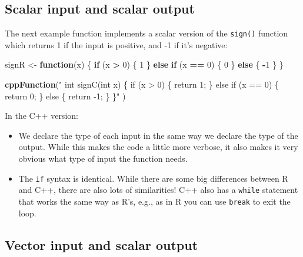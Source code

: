 \documentclass[]{krantz}
\makeatletter
\newenvironment{Shaded}{\begin{snugshade}}{\end{snugshade}}
\newcommand{\KeywordTok}[1]{\textcolor[rgb]{0.27,0.27,0.27}{\textbf{#1}}}
\newcommand{\DecValTok}[1]{\textcolor[rgb]{0.06,0.06,0.06}{#1}}
\newcommand{\StringTok}[1]{\textcolor[rgb]{0.5,0.5,0.5}{#1}}
\newcommand{\ControlFlowTok}[1]{\textcolor[rgb]{0.27,0.27,0.27}{\textbf{#1}}}
\newcommand{\OperatorTok}[1]{\textcolor[rgb]{0.43,0.43,0.43}{\textbf{#1}}}
\newcommand{\NormalTok}[1]{#1}
\newenvironment{kframe}{%
\medskip{}
\setlength{\fboxsep}{.8em}
 \def\at@end@of@kframe{}%
 \ifinner\ifhmode%
  \def\at@end@of@kframe{\end{minipage}}%
  \begin{minipage}{\columnwidth}%
 \fi\fi%
 \def\FrameCommand##1{\hskip\@totalleftmargin \hskip-\fboxsep
 \colorbox{shadecolor}{##1}\hskip-\fboxsep
     \hskip-\linewidth \hskip-\@totalleftmargin \hskip\columnwidth}%
 \MakeFramed {\advance\hsize-\width
   \@totalleftmargin\z@ \linewidth\hsize
   \@setminipage}}%
 {\par\unskip\endMakeFramed%
 \at@end@of@kframe}
\renewenvironment{Shaded}{\begin{kframe}}{\end{kframe}}
\makeatother
\begin{document}
\subsection{Scalar input and scalar
output}\label{scalar-input-and-scalar-output}

The next example function implements a scalar version of the
\texttt{sign()} function which returns 1 if the input is positive, and
-1 if it's negative:

\begin{Shaded}
\begin{Highlighting}[]
\NormalTok{signR <-}\StringTok{ }\ControlFlowTok{function}\NormalTok{(x) \{}
    \ControlFlowTok{if}\NormalTok{ (x }\OperatorTok{>}\StringTok{ }\DecValTok{0}\NormalTok{) \{}
        \DecValTok{1}
\NormalTok{    \} }\ControlFlowTok{else} \ControlFlowTok{if}\NormalTok{ (x }\OperatorTok{==}\StringTok{ }\DecValTok{0}\NormalTok{) \{}
        \DecValTok{0}
\NormalTok{    \} }\ControlFlowTok{else}\NormalTok{ \{}
        \OperatorTok{-}\DecValTok{1}
\NormalTok{    \}}
\NormalTok{\}}

\KeywordTok{cppFunction}\NormalTok{(}\StringTok{"}
\StringTok{  int signC(int x) \{}
\StringTok{    if (x > 0) \{}
\StringTok{      return 1;}
\StringTok{    \} else if (x == 0) \{}
\StringTok{      return 0;}
\StringTok{    \} else \{}
\StringTok{      return -1;}
\StringTok{    \}}
\StringTok{  \}"}
\NormalTok{)}
\end{Highlighting}
\end{Shaded}

In the C++ version:

\begin{itemize}
\item
  We declare the type of each input in the same way we declare the type
  of the output. While this makes the code a little more verbose, it
  also makes it very obvious what type of input the function needs.
\item
  The \texttt{if} syntax is identical. While there are some big
  differences between R and C++, there are also lots of similarities!
  C++ also has a \texttt{while} statement that works the same way as
  R's, e.g., as in R you can use \texttt{break} to exit the loop.
\end{itemize}

\subsection{Vector input and scalar
output}\label{vector-input-and-scalar-output}
\end{document}
